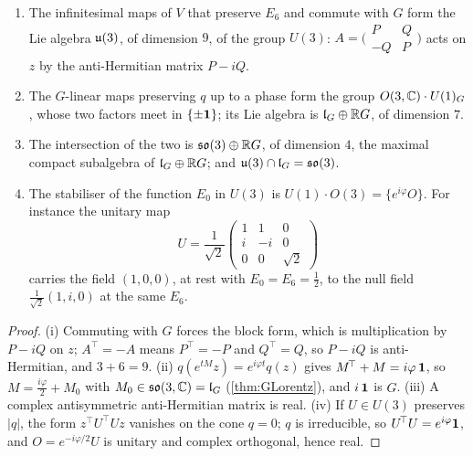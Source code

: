 \begin{proposition}
\label{en:u3}
\begin{enumerate}[label=(\roman*),leftmargin=2.2em]
\item The infinitesimal maps of $V$ that preserve $E_6$ and commute with $G$ form the Lie algebra $\mathfrak{u}(3)$, of dimension $9$, of the group $U(3)$: $A=\bigl(\begin{smallmatrix}P&Q\\-Q&P\end{smallmatrix}\bigr)$
acts on $z$ by the anti-Hermitian matrix $P-iQ$.
\item The $G$-linear maps preserving $q$ up to a phase form the group $O(3,\mathbb{C})\cdot U(1)_G$, whose two factors meet in $\{\pm\mathbf 1\}$; its Lie
algebra is $\mathfrak l_G\oplus\mathbb{R} G$, of dimension $7$.
\item The intersection of the two is $\mathfrak{so}(3)\oplus\mathbb{R} G$, of dimension $4$, the maximal compact subalgebra of $\mathfrak l_G\oplus\mathbb{R} G$; and $\mathfrak{u}(3)\cap\mathfrak l_G=\mathfrak{so}(3)$.
\item The stabiliser of the function $E_0$ in $U(3)$ is $U(1)\cdot O(3)=\{e^{i\varphi}O\}$. For instance the unitary map
\[
U=\frac1{\sqrt2}\begin{pmatrix}1&1&0\\ i&-i&0\\ 0&0&\sqrt2\end{pmatrix}
\]
carries the field $(1,0,0)$, at rest with $E_0=E_6=\tfrac12$, to the null field $\tfrac1{\sqrt2}(1,i,0)$ at the same $E_6$.
\end{enumerate}
\end{proposition}

\begin{proof}
(i) Commuting with $G$ forces the block form, which is multiplication by $P-iQ$ on $z$; $A^{\!\top}=-A$ means $P^{\!\top}=-P$ and $Q^{\!\top}=Q$, so
$P-iQ$ is anti-Hermitian, and $3+6=9$. (ii) $q(e^{tM}z)=e^{i\varphi t}q(z)$ gives $M^{\!\top}+M=i\varphi\,\mathbf 1$, so $M=\tfrac{i\varphi}2+M_0$ with
$M_0\in\mathfrak{so}(3,\mathbb{C})=\mathfrak l_G$ (\cref{thm:GLorentz}), and $i\,\mathbf 1$ is $G$. (iii) A complex antisymmetric anti-Hermitian matrix is real. (iv) If $U\in U(3)$
preserves $|q|$, the form $z^{\!\top}U^{\!\top}Uz$ vanishes on the cone $q=0$; $q$ is irreducible, so $U^{\!\top}U=e^{i\varphi}\mathbf 1$, and
$O=e^{-i\varphi/2}U$ is unitary and complex orthogonal, hence real.
\end{proof}

